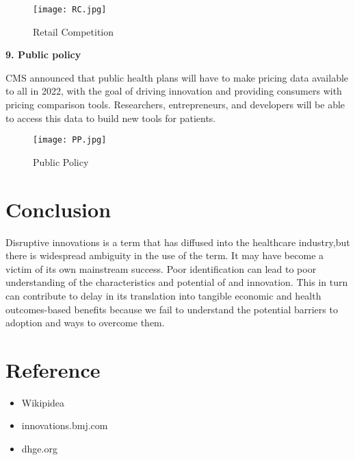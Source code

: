 \documentclass[12pt,a4paper]{article}
\begin{document}
\hspace{5cm}

\begin{figure}[h]
\centering
\texttt{[image: RC.jpg]}
\caption{Retail Competition}
\end{figure}


\textbf{9. Public policy}

\hspace{1cm}
         
CMS announced that public health plans will have to make pricing data available to all in 2022, with the goal of driving innovation and providing consumers with pricing comparison tools. Researchers, entrepreneurs, and developers will be able to access this data to build new tools for patients. 

\hspace{5cm}

\begin{figure}[h]
\centering
\texttt{[image: PP.jpg]}
\caption{Public Policy}
\end{figure}
 

\section{Conclusion}

Disruptive innovations is a term that has diffused into the healthcare industry,but there is widespread ambiguity in the use of the term. It may have become a victim of its own mainstream success. Poor identification can lead to poor understanding of the characteristics and potential of and innovation. This in turn can contribute to delay in its translation into tangible economic and health outcomes-based benefits because we fail to understand the potential barriers to adoption and ways to overcome them.


\clearpage

\section{Reference}

\begin{itemize}
\item Wikipidea
\item innovations.bmj.com
\item dhge.org
\end{itemize}
\end{document}
